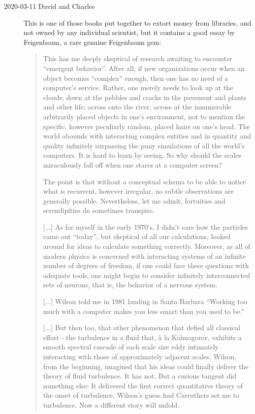 \begin{description}
  \item[2020-03-11 David and Charles]
This is one of those books put together to extort money from libraries,
and not owned by any individual scientist, but it contains a good essay
by Feigenbaum, a rare genuine Feigenbaum gem:

\begin{quote}
This has me deeply skeptical of research awaiting to encounter ``emergent
behavior''. After all, if new organizations occur when an object becomes
``complex'' enough, then one has no need of a computer's service. Rather,
one merely needs to look up at the clouds; down at the pebbles and cracks
in the pavement and plants and other life; across onto the river, across
at the innumerable arbitrarily placed objects in one's environment, not
to mention the specific, however peculiarly random, placed hairs on one's
head. The world abounds with interacting complex entities and in quantity
and quality infinitely surpassing the puny simulations of all the world's
computers. It is hard to learn by seeing. So why should the scales
miraculously fall off when one stares at a computer screen?

The point is that without a conceptual schema to be able to notice what
is recurrent, however irregular, no subtle observations are generally
possible. Nevertheless, let me admit, fortuities and serendipities do
sometimes transpire.

[...]
As for myself in the early 1970's, I didn't care how the particles came
out ``today'', but skeptical of all our calculations, looked around for
ideas to calculate something correctly. Moreover, as all of modern
physics is concerned with interacting systems of an infinite number of
degrees of freedom, if one could face these questions with adequate
tools, one might begin to consider infinitely interconnected sets of
neurons, that is, the behavior of a nervous system.

[...]
Wilson told me in 1981 landing in Santa Barbara ``Working too much with a
computer makes you less smart than you used to be.''

[...]
But then too, that other phenomenon that defied all classical effort -
the turbulence in a fluid that, à la Kolmogorov, exhibits a smooth
spectral cascade of each scale size eddy intimately interacting with
those of approximately adjacent scales. Wilson, from the beginning,
imagined that his ideas could finally deliver the theory of fluid
turbulence. It has not. But a curious tangent did something else: It
delivered the first correct quantitative theory of the onset of
turbulence. Wilson's guess had Carruthers set me to turbulence. Now a
different story will unfold.
\end{quote}


\end{description}

